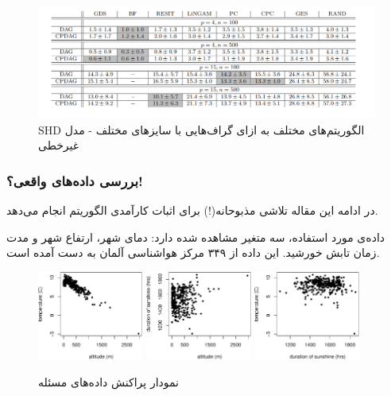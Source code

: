 \documentclass[a4paper,12pt]{article}
\begin{document}
\begin{figure}[h!]
\centering
\includegraphics[scale=0.42]{dif.png}
	\caption{SHD
	الگوریتم‌های مختلف به ازای گراف‌هایی با سایز‌های مختلف	 - مدل غیرخطی
}
\end{figure}

\subsubsection{بررسی داده‌های واقعی؟!}
در ادامه این مقاله تلاشی مذبوحانه(!) برای اثبات کارآمدی الگوریتم 
انجام می‌دهد.

داده‌ی مورد استفاده، سه متغیر‌ مشاهده شده دارد: دمای شهر، ارتفاع شهر و مدت زمان تابش خورشید. این داده از ۳۴۹ مرکز هواشناسی آلمان به دست آمده است.
\begin{figure}[h!]
	\begin{center}
		\includegraphics[width=0.31\textwidth]{experimentAltTempcut}
		\hspace{0.02\textwidth}
		\includegraphics[width=0.31\textwidth]{experimentAltSuncut}
		\hspace{0.02\textwidth}
		\includegraphics[width=0.31\textwidth]{experimentSunTempcut}
	\end{center}
	\caption{نمودار پراکنش داده‌های مسئله}
	\label{fig:alt}
\end{figure}
\end{document}
